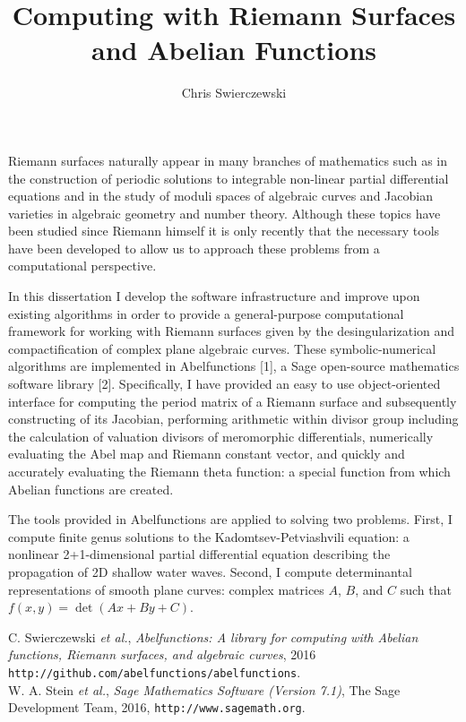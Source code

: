 \documentclass[12pt]{amsart}
\title{Computing with Riemann Surfaces and Abelian Functions}
\author{Chris Swierczewski}
\begin{document}

\maketitle

Riemann surfaces naturally appear in many branches of mathematics such as in the
construction of periodic solutions to integrable non-linear partial differential
equations and in the study of moduli spaces of algebraic curves and Jacobian
varieties in algebraic geometry and number theory. Although these topics have
been studied since Riemann himself it is only recently that the necessary tools
have been developed to allow us to approach these problems from a computational
perspective.

In this dissertation I develop the software infrastructure and improve upon
existing algorithms in order to provide a general-purpose computational
framework for working with Riemann surfaces given by the desingularization and
compactification of complex plane algebraic curves. These symbolic-numerical
algorithms are implemented in Abelfunctions [1], a Sage open-source mathematics
software library [2]. Specifically, I have provided an easy to use
object-oriented interface for computing the period matrix of a Riemann surface
and subsequently constructing of its Jacobian, performing arithmetic within
divisor group including the calculation of valuation divisors of meromorphic
differentials, numerically evaluating the Abel map and Riemann constant vector,
and quickly and accurately evaluating the Riemann theta function: a special
function from which Abelian functions are created.

The tools provided in Abelfunctions are applied to solving two problems. First,
I compute finite genus solutions to the Kadomtsev-Petviashvili equation: a
nonlinear 2+1-dimensional partial differential equation describing the
propagation of 2D shallow water waves. Second, I compute determinantal
representations of smooth plane curves: complex matrices $A$, $B$, and $C$ such
that $f(x,y) = \det(Ax + By + C)$.

\vfill

\tiny

\noindent [1] C. Swierczewski {\it et al.}, {\it Abelfunctions: A library for
  computing with Abelian functions, Riemann surfaces, and algebraic curves},
2016 {\tt http://github.com/abelfunctions/abelfunctions}. \\

\noindent [2] W. A. Stein {\it et al.}, {\it Sage Mathematics Software (Version
  7.1)}, The Sage Development Team, 2016, {\tt http://www.sagemath.org}.
\end{document}
